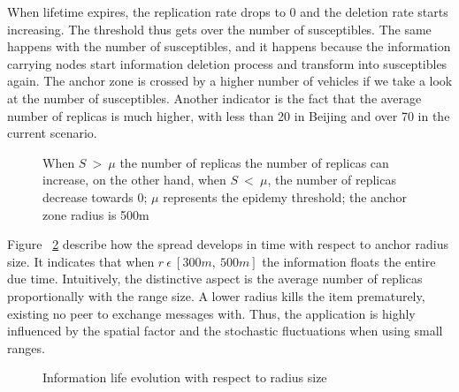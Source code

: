 When lifetime expires, the replication rate drops to 0 and the deletion rate
starts increasing. The threshold thus gets over the number of susceptibles.
The same happens with the number of susceptibles, and it happens because the
information carrying nodes start information deletion process and transform into
susceptibles again. The anchor zone is crossed by a higher number of vehicles if
we take a look at the number of susceptibles. Another indicator is the fact that
the average number of replicas is much higher, with less than 20 in Beijing and
over 70 in the current scenario.

\begin{figure}[h]
	\centering
	\def\svgwidth{\columnwidth}
	
	\caption{When $S\ >\ \mu$ the number of replicas the number of replicas can
	increase, on the other hand, when $S\ <\ \mu$, the number of replicas decrease
	towards 0; $\mu$ represents the epidemy threshold; the anchor zone radius is
	500m}
 	\label{fig:SanFrancisco_info_epidemy}
 \end{figure}
 
 Figure ~\ref{fig:SanFrancisco_info_evolution_range} describe how the spread
 develops in time with respect to anchor radius size. It indicates that when $r\
 \epsilon\ [300m,\ 500m]$ the information floats the entire due time.
 Intuitively, the distinctive aspect is the average number of replicas
 proportionally with the range size. A lower radius kills the item prematurely,
 existing no peer to exchange messages with. Thus, the application is highly
 influenced by the spatial factor and the stochastic fluctuations when using
 small ranges.
 
 \begin{figure}[t]
	\centering
	\def\svgwidth{\columnwidth}
	
	\caption{Information life evolution with respect to radius size}
 	\label{fig:SanFrancisco_info_evolution_range}
 \end{figure}

